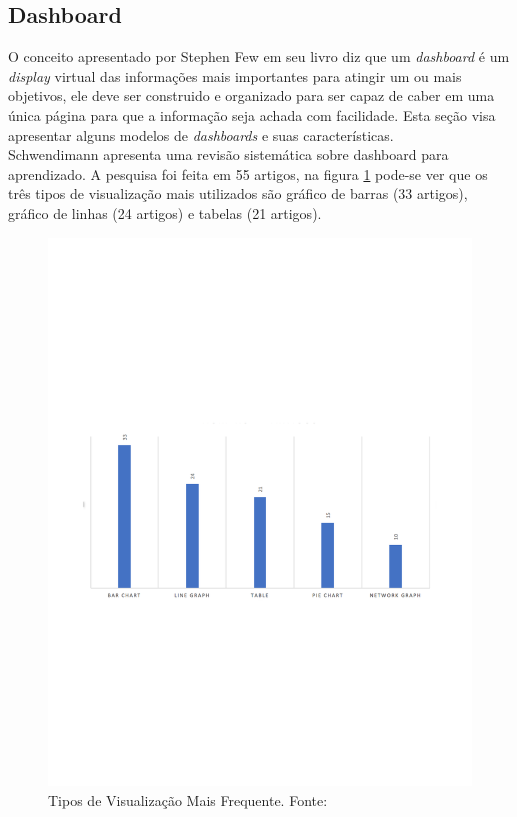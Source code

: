 \subsection{Dashboard}
O conceito apresentado por Stephen Few em seu livro \cite{book_design} diz que um \textit{dashboard} é um \textit{display} virtual das informações mais importantes para atingir um ou mais objetivos, ele deve ser construido e organizado para ser capaz de caber em uma única página para que a informação seja achada com facilidade. Esta seção visa apresentar alguns modelos de \textit{dashboards} e suas características.
\\Schwendimann \cite{schwendimann_perceiving_2016} apresenta uma revisão sistemática sobre dashboard para aprendizado. A pesquisa foi feita em 55 artigos, na figura \ref{img:tipo_visualizacao} pode-se ver que os três tipos de visualização mais utilizados são gráfico de barras (33 artigos), gráfico de linhas (24 artigos) e tabelas (21 artigos).
\graphicspath{{figuras/}}
\begin{figure}[h]
\centering
\includegraphics[scale=0.50]{grafico_pesquisa}
\caption{Tipos de Visualização Mais Frequente. Fonte: \cite{schwendimann_perceiving_2016}}
\label{img:tipo_visualizacao}
\end{figure}


